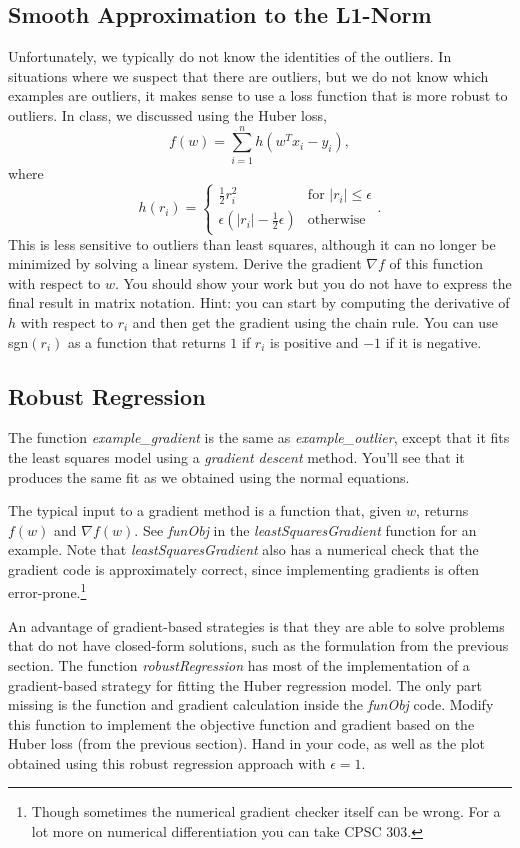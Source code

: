 \documentclass{article}
\def\blu#1{{\color{blu}#1}}
\def\red#1{{\color{red}#1}}
\def\half{\frac 1 2}
\begin{document}
\subsection{Smooth Approximation to the L1-Norm}

Unfortunately, we typically do not know the identities of the outliers. In situations where we suspect that there are outliers, but we do not know which examples are outliers, it makes sense to use a loss function that is more robust to outliers. In class, we discussed using the Huber loss,
\[
f(w) = \sum_{i=1}^n h(w^Tx_i  -y_i),
\]
where
\[
h(r_i) = 
\begin{cases}
\half r_i^2 & \text{for $|r_i| \leq \epsilon$}\\
\epsilon(|r_i| - \half \epsilon) & \text{otherwise}
\end{cases}.
\]
This is less sensitive to outliers than least squares, although it can no longer be minimized by solving a linear system.
 \blu{Derive
 the gradient $\nabla f$ of this function with respect to $w$. You should show your work but you do not have to express the final result in matrix notation.}
 Hint: you can start by computing the derivative of $h$ with respect to $r_i$ and then get the gradient using the chain rule. You can use sgn$(r_i)$ as a function that returns $1$ if $r_i$ is positive and $-1$ if it is negative.


\subsection{Robust Regression}

The function \emph{example\_gradient} is the same as \emph{example\_outlier}, except that it fits the least squares model using a \emph{gradient descent} method. You'll see that it produces the same fit as we obtained using the normal equations.

The typical input to a gradient method is a function that, given $w$, returns $f(w)$ and $\nabla f(w)$. See \emph{funObj} in the \emph{leastSquaresGradient} function for an example. Note that \emph{leastSquaresGradient} also has a numerical check that the gradient code is approximately correct, since implementing gradients is often error-prone.\footnote{Though sometimes the numerical gradient checker itself can be wrong. For a lot more on numerical differentiation you can take CPSC 303.}

An advantage of gradient-based strategies is that they are able to solve problems that do not have closed-form solutions, such as the formulation from the previous section. The function \emph{robustRegression} has most of the implementation of a gradient-based strategy for fitting the Huber regression model. The only part missing is the function and gradient calculation inside the \emph{funObj} code. \blu{Modify this function to implement the objective function and gradient based on the Huber loss (from the previous section). Hand in your code, as well as the plot obtained using this robust regression approach \red{with $\epsilon = 1$}.}
\end{document}
